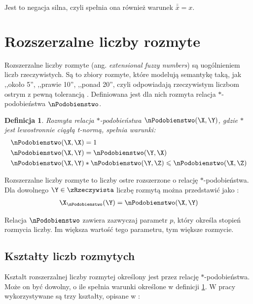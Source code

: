 \documentclass[a4paper,twoside,12pt]{book}
\newtheorem{Definition}{Definicja}
\newcommand{\obcy}[1]{\emph{#1}}
\newcommand{\english}[1]{{\selectlanguage{british}\obcy{#1}}}
\begin{document}
Jest to negacja silna, czyli spełnia ona również warunek $\bar{\bar{x}} = x$.

\section{Rozszerzalne liczby rozmyte}
\label{sec:rozszerzalne-liczby-rozmyte}

Rozszerzalne liczby rozmyte (ang. \english{extensional fuzzy numbers}) są uogólnieniem liczb rzeczywistych. Są to zbiory rozmyte, które modelują semantykę taką, jak ,,około 5'', ,,prawie 10'', ,,ponad 20'', czyli odpowiadają rzeczywistym liczbom ostrym z pewną tolerancją \cite{bib:arithmetics-extensional-fuzzy-numbers,bib:mathematics-fuzzy-sets-logic}. Definiowana jest dla nich rozmyta relacja $\ast$-podobieństwa $\nPodobienstwo$.

\begin{Definition}
\label{def:fuzzy-similarity}
	\cite{bib:arithmetics-extensional-fuzzy-numbers} Rozmyta relacja $\ast$-podobieństwa $\nPodobienstwo(\X,\Y)$, gdzie $\ast$ jest lewostronnie ciągłą t-normą, spełnia warunki:
	\begin{align}
		\nPodobienstwo(\X,\X) & = 1 \\
		\nPodobienstwo(\X,\Y) & = \nPodobienstwo(\Y,\X)\\
		\nPodobienstwo(\X,\Y) & \ast \nPodobienstwo(\Y,\Z) \leqslant \nPodobienstwo(\X,\Z)
	\end{align}
\end{Definition}

Rozszerzalne liczby rozmyte to liczby ostre rozszerzone o relację $\ast$-podobieństwa. Dla dowolnego $\Y \in \zRzeczywista$ liczbę rozmytą można przedstawić jako \cite{bib:arithmetics-extensional-fuzzy-numbers}:
\begin{align}
	\X_{\nPodobienstwo}(\Y) = \nPodobienstwo(\X, \Y)
\end{align}

Relacja $\nPodobienstwo$ zawiera zazwyczaj parametr $p$, który określa stopień rozmycia liczby. Im większa wartość tego parametru, tym większe rozmycie.

\subsection{Kształty liczb rozmytych}
\label{sec:ksztalty-liczb-rozmytych}

Kształt rozszerzalnej liczby rozmytej określony jest przez relację $\ast$-podobieństwa. Może on być dowolny, o ile spełnia warunki określone w definicji \ref{def:fuzzy-similarity}. W pracy wykorzystywane są trzy kształty, opisane w \cite{bib:fuzzy-numbers-revisited-logic-operations}:
\end{document}
